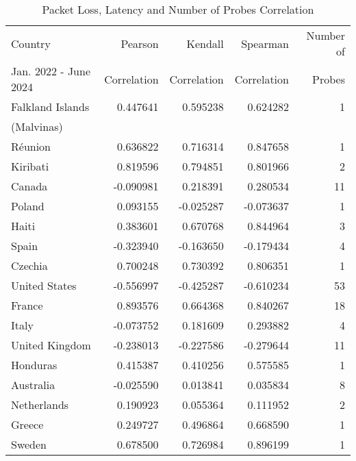 \begin{table}[ht]
	\footnotesize
	\caption{Packet Loss, Latency and Number of Probes Correlation}
	\label{fig:packetloss-latency-number-probes-correlation}
	\begin{tabular}{lrrrr}
		\toprule
		Country               & Pearson     & Kendall     & Spearman    & Number of \\
		Jan. 2022 - June 2024 & Correlation & Correlation & Correlation & Probes    \\
		\midrule
		Falkland Islands      & 0.447641    & 0.595238    & 0.624282    & 1         \\
		(Malvinas)                                                                  \\
		Réunion               & 0.636822    & 0.716314    & 0.847658    & 1         \\
		Kiribati              & 0.819596    & 0.794851    & 0.801966    & 2         \\
		Canada                & -0.090981   & 0.218391    & 0.280534    & 11        \\
		Poland                & 0.093155    & -0.025287   & -0.073637   & 1         \\
		Haiti                 & 0.383601    & 0.670768    & 0.844964    & 3         \\
		Spain                 & -0.323940   & -0.163650   & -0.179434   & 4         \\
		Czechia               & 0.700248    & 0.730392    & 0.806351    & 1         \\
		United States         & -0.556997   & -0.425287   & -0.610234   & 53        \\
		France                & 0.893576    & 0.664368    & 0.840267    & 18        \\
		Italy                 & -0.073752   & 0.181609    & 0.293882    & 4         \\
		United Kingdom        & -0.238013   & -0.227586   & -0.279644   & 11        \\
		Honduras              & 0.415387    & 0.410256    & 0.575585    & 1         \\
		Australia             & -0.025590   & 0.013841    & 0.035834    & 8         \\
		Netherlands           & 0.190923    & 0.055364    & 0.111952    & 2         \\
		Greece                & 0.249727    & 0.496864    & 0.668590    & 1         \\
		Sweden                & 0.678500    & 0.726984    & 0.896199    & 1         \\

\end{tabular}
\end{table}
